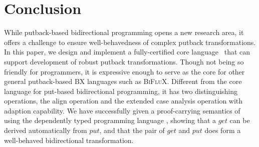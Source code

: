 \section{Conclusion}
\label{sec:con}
While putback-based bidirectional programming opens a new research area,
it offers a challenge to ensure well-behavedness of complex putback transformations.
In this paper, we design and implement a fully-certified core language \BiGUL\
that can support development of robust putback transformations.
Though not being so friendly for programmers, it is expressive enough to serve as the core 
for other general putback-based BX languages such as \textsc{BiFluX}. 
Different from the core language for
put-based bidirectional programming, it has two 
distinguishing operations, the align operation and the extended case analysis 
operation with adaption capability. We have successfully given a proof-carrying semantics
of \BiGUL using the dependently typed programming language \Agda,
showing that a $get$ can be derived automatically from $put$, and that the pair of $get$ and $put$ 
does form a well-behaved bidirectional transformation. 




